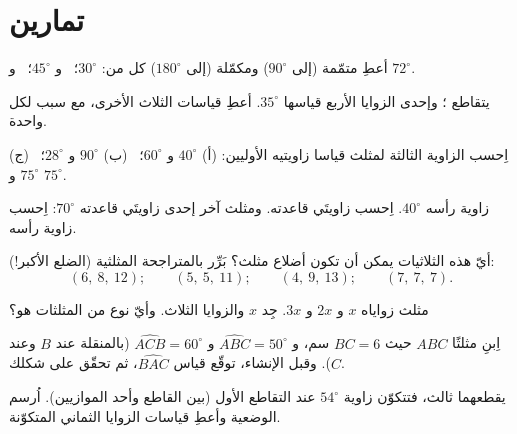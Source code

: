 \section{تمارين}

\begin{exercise}[$\star$]\label{exo:g7:triangles:1}
أعطِ متمّمة (إلى $90^\circ$) ومكمّلة (إلى
$180^\circ$) كل من: $30^\circ$؛ \ و $45^\circ$؛ \ و $72^\circ$.
\end{exercise}

\begin{exercise}[$\star$]\label{exo:g7:triangles:2}
يتقاطع ؛ وإحدى الزوايا الأربع قياسها $35^\circ$. أعطِ
قياسات الثلاث الأخرى، مع سبب لكل واحدة.
\end{exercise}

\begin{exercise}[$\star$]\label{exo:g7:triangles:3}
اِحسب الزاوية الثالثة لمثلث قياسا زاويتيه الأوليين:
(أ) $40^\circ$ و $60^\circ$؛ \
(ب) $90^\circ$ و $28^\circ$؛ \
(ج) $75^\circ$ و $75^\circ$.
\end{exercise}

\begin{exercise}[$\star$]\label{exo:g7:triangles:4}
 زاوية رأسه $40^\circ$. اِحسب
زاويتَي قاعدته. ومثلث آخر  إحدى زاويتَي قاعدته
$70^\circ$: اِحسب زاوية رأسه.
\end{exercise}

\begin{exercise}[$\star$]\label{exo:g7:triangles:5}
أيّ هذه الثلاثيات يمكن أن تكون أضلاع مثلث؟ بَرِّر بالمتراجحة
المثلثية (الضلع الأكبر!):
\[
(6,\ 8,\ 12); \qquad
(5,\ 5,\ 11); \qquad
(4,\ 9,\ 13); \qquad
(7,\ 7,\ 7).
\]
\end{exercise}

\begin{exercise}[$\star$]\label{exo:g7:triangles:6}
مثلث زواياه $x$ و $2x$ و $3x$. جِد $x$ والزوايا
الثلاث. وأيّ نوع من المثلثات هو؟
\end{exercise}

\begin{exercise}[$\star$]\label{exo:g7:triangles:7}
اِبنِ مثلثًا $ABC$ حيث $BC = 6$ سم،
و $\widehat{ABC} = 50^\circ$ و $\widehat{ACB} = 60^\circ$ (بالمنقلة
عند $B$ وعند $C$). وقبل الإنشاء، توقّع قياس
$\widehat{BAC}$، ثم تحقّق على شكلك.
\end{exercise}

\begin{exercise}[$\star\star$]\label{exo:g7:triangles:8}
 يقطعهما  ثالث، فتتكوّن زاوية
$54^\circ$ عند التقاطع الأول (بين  القاطع وأحد
الموازيين). اُرسم الوضعية وأعطِ قياسات الزوايا الثماني
المتكوّنة.
\end{exercise}

